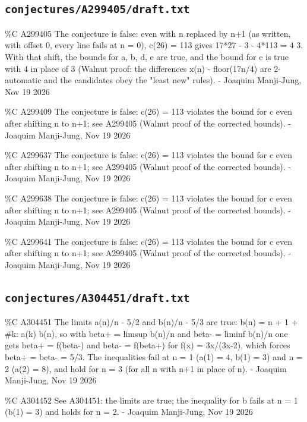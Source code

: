 \subsection*{\texttt{conjectures/A299405/draft.txt}}
{\small\raggedright\ttfamily
\%C A299405 The conjecture is false: even with n replaced by n+1 (as written, with offset 0, every line fails at n = 0), c(26) = 113 gives 17*27 - 3 - 4*113 = 4  3. With that shift, the bounds for a, b, d, e are true, and the bound for c is true with 4 in place of 3 (Walnut proof: the differences x(n) - floor(17n/4) are 2-automatic and the candidates obey the "least new" rules). - Joaquim Manji-Jung, Nov 19 2026\par
\%C A299409 The conjecture is false: c(26) = 113 violates the bound for c even after shifting n to n+1; see A299405 (Walnut proof of the corrected bounds). - Joaquim Manji-Jung, Nov 19 2026\par
\%C A299637 The conjecture is false: c(26) = 113 violates the bound for c even after shifting n to n+1; see A299405 (Walnut proof of the corrected bounds). - Joaquim Manji-Jung, Nov 19 2026\par
\%C A299638 The conjecture is false: c(26) = 113 violates the bound for c even after shifting n to n+1; see A299405 (Walnut proof of the corrected bounds). - Joaquim Manji-Jung, Nov 19 2026\par
\%C A299641 The conjecture is false: c(26) = 113 violates the bound for c even after shifting n to n+1; see A299405 (Walnut proof of the corrected bounds). - Joaquim Manji-Jung, Nov 19 2026\par
}
\subsection*{\texttt{conjectures/A304451/draft.txt}}
{\small\raggedright\ttfamily
\%C A304451 The limits a(n)/n - 5/2 and b(n)/n - 5/3 are true: b(n) = n + 1 + \#k: a(k)  b(n), so with beta+ = limsup b(n)/n and beta- = liminf b(n)/n one gets beta+ = f(beta-) and beta- = f(beta+) for f(x) = 3x/(3x-2), which forces beta+ = beta- = 5/3. The inequalities fail at n = 1 (a(1) = 4, b(1) = 3) and n = 2 (a(2) = 8), and hold for n = 3 (for all n with n+1 in place of n). - Joaquim Manji-Jung, Nov 19 2026\par
\%C A304452 See A304451: the limits are true; the inequality for b fails at n = 1 (b(1) = 3) and holds for n = 2. - Joaquim Manji-Jung, Nov 19 2026\par
}
